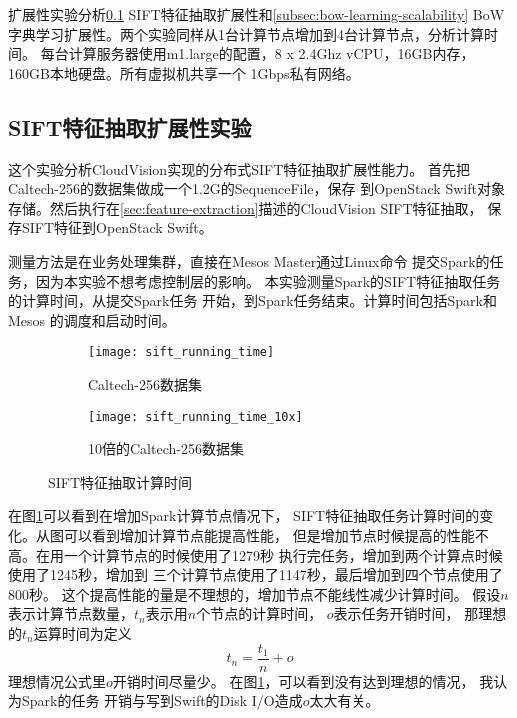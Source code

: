 扩展性实验分析\ref{subsec:sift-scalability} SIFT特征抽取扩展性和\ref{subsec:bow-learning-scalability}
BoW字典学习扩展性。两个实验同样从1台计算节点增加到4台计算节点，分析计算时间。
每台计算服务器使用m1.large的配置，8 x 2.4Ghz vCPU，16GB内存，160GB本地硬盘。所有虚拟机共享一个
1Gbps私有网络。

\subsection{SIFT特征抽取扩展性实验}
\label{subsec:sift-scalability}
这个实验分析CloudVision实现的分布式SIFT特征抽取扩展性能力。
首先把Caltech-256的数据集做成一个1.2G的SequenceFile，保存
到OpenStack Swift对象存储。然后执行在\ref{sec:feature-extraction}描述的CloudVision SIFT特征抽取，
保存SIFT特征到OpenStack Swift。

测量方法是在业务处理集群，直接在Mesos Master通过Linux命令
提交Spark的任务，因为本实验不想考虑控制层的影响。
本实验测量Spark的SIFT特征抽取任务的计算时间，从提交Spark任务
开始，到Spark任务结束。计算时间包括Spark和Mesos
的调度和启动时间。

\begin{figure}[h]
  \captionsetup[subfigure]{aboveskip=2pt,belowskip=2pt}
  \centering
  \begin{subfigure}[b]{0.49\textwidth}
    \texttt{[image: sift\_running\_time]}
    \caption{Caltech-256数据集}
    \label{fig:sift-running-time}
  \end{subfigure}
  \begin{subfigure}[b]{0.49\textwidth}
    \texttt{[image: sift\_running\_time\_10x]}
    \caption{10倍的Caltech-256数据集}
    \label{fig:sift-running-time-10x}
  \end{subfigure}
  \caption{SIFT特征抽取计算时间}

\end{figure}

在图\ref{fig:sift-running-time}可以看到在增加Spark计算节点情况下，
SIFT特征抽取任务计算时间的变化。从图可以看到增加计算节点能提高性能，
但是增加节点时候提高的性能不高。在用一个计算节点的时候使用了1279秒
执行完任务，增加到两个计算点时候使用了1245秒，增加到
三个计算节点使用了1147秒，最后增加到四个节点使用了800秒。
这个提高性能的量是不理想的，增加节点不能线性减少计算时间。
假设$n$表示计算节点数量，$t_n$表示用$n$个节点的计算时间，
$o$表示任务开销时间，
那理想的$t_n$运算时间为定义
\begin{equation} \label{eq:running-time}
t_n = \frac{t_1}{n} + o
\end{equation}
理想情况公式里$o$开销时间尽量少。
在图\ref{fig:sift-running-time}，可以看到没有达到理想的情况，
我认为Spark的任务
开销与写到Swift的Disk I/O造成$o$太大有关。


